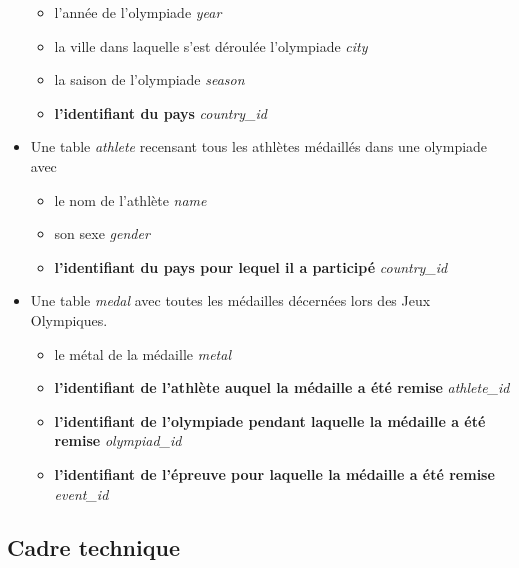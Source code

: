 \documentclass{article}
\begin{document}
\begin{itemize}
\begin{itemize}
\item l'année de l'olympiade \textit{year}

\item la ville dans laquelle s'est déroulée l'olympiade \textit{city}

\item la saison de l'olympiade \textit{season}

\item \textbf{l'identifiant du pays} \textit{country\_id}

\end{itemize}

\item
Une table \textit{athlete} recensant tous les athlètes médaillés dans une olympiade avec 

\begin{itemize}

\item le nom de l'athlète \textit{name}

\item son sexe \textit{gender}

\item \textbf{l'identifiant du pays pour lequel il a participé} \textit{country\_id}

\end{itemize}

\item
Une table \textit{medal} avec toutes les médailles décernées lors des Jeux Olympiques.

\begin{itemize}

\item le métal de la médaille \textit{metal}

\item \textbf{l'identifiant de l'athlète auquel la médaille a été remise} \textit{athlete\_id}

\item \textbf{l'identifiant de l'olympiade pendant laquelle la médaille a été remise} \textit{olympiad\_id}

\item \textbf{l'identifiant de l'épreuve pour laquelle la médaille a été remise} \textit{event\_id}

\end{itemize}

\end{itemize}

\subsection{Cadre technique}
\end{document}
